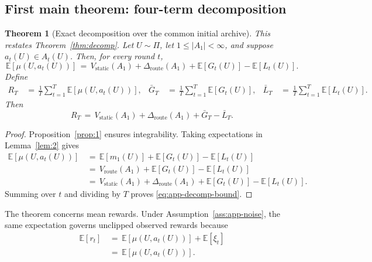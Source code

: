 \documentclass{article} %
\newtheorem{theorem}{Theorem}
\begin{document}
\subsection{First main theorem: four-term decomposition}

\begin{theorem}[Exact decomposition over the common initial archive]
\label{thm:main}
This restates Theorem~\ref{thm:decomp}.  Let \(U\sim\Pi\), let
\(1\leq |A_1|<\infty\), and suppose \(a_t(U)\in A_t(U)\).  Then, for every
round \(t\),
\begin{equation}
\mathbb{E}[\mu(U,a_t(U))]
\,=\,
V_{\mathrm{static}}(A_1)
+
\Delta_{\mathrm{route}}(A_1)
+
\mathbb{E}[G_t(U)]
-
\mathbb{E}[L_t(U)].
\end{equation}
Define
\begin{equation}
\begin{aligned}
R_T
&\,=\,\frac1T\sum_{t=1}^T\mathbb E[\mu(U,a_t(U))], &
\bar G_T
&\,=\,\frac1T\sum_{t=1}^T\mathbb E[G_t(U)], &
\bar L_T
&\,=\,\frac1T\sum_{t=1}^T\mathbb E[L_t(U)].
\end{aligned}
\end{equation}
Then
\begin{equation}
\label{eq:app-decomp-bound}
R_T
\,=\,
V_{\mathrm{static}}(A_1)
+
\Delta_{\mathrm{route}}(A_1)
+
\bar G_T
-
\bar L_T.
\end{equation}
\end{theorem}

\begin{proof}
Proposition~\ref{prop:1} ensures integrability.  Taking expectations in
Lemma~\ref{lem:2} gives
\begin{equation}
\begin{aligned}
\mathbb{E}[\mu(U,a_t(U))]
&\,=\,
  \mathbb E[m_1(U)]+\mathbb E[G_t(U)]-\mathbb E[L_t(U)] \\
&\,=\,
  V_{\mathrm{route}}(A_1)+\mathbb E[G_t(U)]-\mathbb E[L_t(U)] \\
&\,=\,
V_{\mathrm{static}}(A_1)
+
\Delta_{\mathrm{route}}(A_1)
+
\mathbb E[G_t(U)]
-
\mathbb E[L_t(U)].
\end{aligned}
\end{equation}
Summing over \(t\) and dividing by \(T\) proves
\eqref{eq:app-decomp-bound}.
\end{proof}

The theorem concerns mean rewards.  Under Assumption~\ref{ass:app-noise}, the
same expectation governs unclipped observed rewards because
\begin{equation}
\label{eq:app-observed-mean-link}
\begin{aligned}
\mathbb{E}[r_t]
&\,=\,\mathbb E[\mu(U,a_t(U))]+\mathbb E[\xi_t] \\
&\,=\,
\mathbb{E}[\mu(U,a_t(U))].
\end{aligned}
\end{equation}
\end{document}
